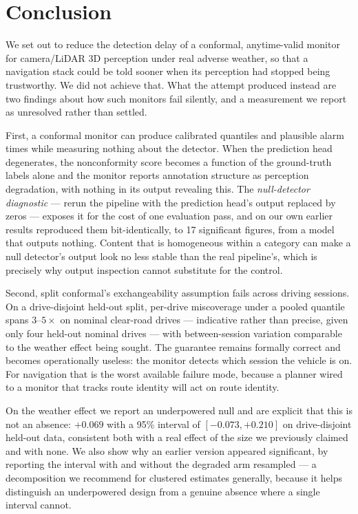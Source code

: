 \section{Conclusion}
\label{sec:conclusion}

We set out to reduce the detection delay of a conformal, anytime-valid
monitor for camera/LiDAR 3D perception under real adverse weather, so that
a navigation stack could be told sooner when its perception had stopped
being trustworthy. We did not achieve that. What the attempt produced
instead are two findings about how such monitors fail silently, and a
measurement we report as unresolved rather than settled.

First, a conformal monitor can produce calibrated quantiles and plausible
alarm times while measuring nothing about the detector. When the prediction
head degenerates, the nonconformity score becomes a function of the
ground-truth labels alone and the monitor reports annotation structure as
perception degradation, with nothing in its output revealing this. The
\emph{null-detector diagnostic} --- rerun the pipeline with the prediction
head's output replaced by zeros --- exposes it for the cost of one
evaluation pass, and on our own earlier results reproduced them
bit-identically, to 17 significant figures, from a model that outputs
nothing. Content that is homogeneous within a category can make a null
detector's output look no less stable than the real pipeline's, which is
precisely why output inspection cannot substitute for the control.

Second, split conformal's exchangeability assumption fails across driving
sessions. On a drive-disjoint held-out split, per-drive miscoverage under a
pooled quantile spans $3$--$5\times$ on nominal clear-road drives ---
indicative rather than precise, given only four held-out nominal drives ---
with between-session variation comparable to the weather effect being
sought. The guarantee remains formally correct and becomes operationally
useless: the monitor detects which session the vehicle is on. For
navigation that is the worst available failure mode, because a planner
wired to a monitor that tracks route identity will act on route identity.

On the weather effect we report an underpowered null and are explicit that
this is not an absence: $+0.069$ with a 95\% interval of $[-0.073,
+0.210]$ on drive-disjoint held-out data, consistent both with a real
effect of the size we previously claimed and with none. We also show why an
earlier version appeared significant, by reporting the interval with and
without the degraded arm resampled --- a decomposition we recommend for
clustered estimates generally, because it helps distinguish an underpowered
design from a genuine absence where a single interval cannot.

